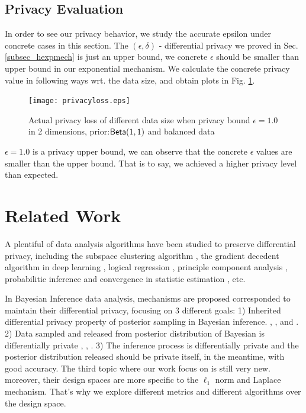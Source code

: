 \documentclass{article}
\begin{document}
\subsection{Privacy Evaluation}
\label{subsec_experiment_privacy}
In order to see our privacy behavior, we study the accurate epsilon under concrete cases in this section. The $(\epsilon, \delta)$ - differential privacy we proved in Sec. \ref{subsec_hexpmech} is just an upper bound, we concrete $\epsilon$ should be smaller than upper bound in our exponential mechanism. We calculate the concrete privacy value in following ways wrt. the data size, and obtain plots in Fig. \ref{fig_privacy}.

\begin{figure}
\begin{center}
\centering
    \texttt{[image: privacyloss.eps]}
\caption{Actual privacy loss of different data size when privacy bound $\epsilon = 1.0$ in 2 dimensions, prior:$\mathsf{Beta}(1,1)$ and balanced data}
\label{fig_privacy}
\end{center}
\end{figure}

$\epsilon = 1.0$ is a privacy upper bound, we can observe that the concrete $\epsilon$ values are smaller than the upper bound. That is to say, we achieved a higher privacy level than expected. 



\section{Related Work}

A plentiful of data analysis algorithms have been studied to preserve differential privacy, including the subspace clustering algorithm \cite{wang2015differentially}, the gradient decedent algorithm in deep learning \cite{abadi2016deep}, logical regression \cite{chaudhuri2009privacy}, principle component analysis \cite{chaudhuri2012near}, probabilitic inference \cite{williams2010probabilistic} and convergence in statistic estimation \cite{chaudhuri2012convergence}, etc. 

In Bayesian Inference data analysis, mechanisms are proposed corresponded to maintain their differential privacy, focusing on 3 different goals: 1) Inherited differential privacy property of posterior sampling in Bayesian inference. \cite{dimitrakakis2014robust}, \cite{zhang2016differential}, \cite{zheng2015differential} and \cite{wang2015privacy}. 2) Data sampled and released from posterior distribution of Bayesian is differentially private \cite{Zhang2017privbayes}, \cite{dimitrakakis2015differential},  \cite{foulds2016theory}. 3) The inference process is differentially private and the posterior distribution released should be private itself, in the meantime, with good accuracy. The third topic where our work focus on is still very new. moreover, their design spaces are more specific to the $\ell_1$ norm and Laplace mechanism. That's why we explore different metrics and different algorithms over the design space.
\end{document}

